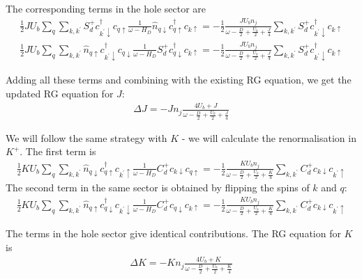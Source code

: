 The corresponding terms in the hole sector are
\begin{equation}\begin{aligned}
	\frac{1}{2} J U_b \sum_{q} \sum_{k,k^\prime} S_d^+ c^\dagger_{k^\prime \downarrow} c_{q \uparrow} \frac{1}{\omega - H_D} \hat n_{q \downarrow} c^\dagger_{q \uparrow}c_{k \uparrow} = -\frac{1}{2}\frac{J U_b n_j}{\omega - \frac{D}{2} + \frac{U_b}{2} + \frac{J}{4}} \sum_{k,k^\prime} S_d^+ c^\dagger_{k^\prime \downarrow} c_{k \uparrow}
\end{aligned}\end{equation}
\begin{equation}\begin{aligned}
	\frac{1}{2} J U_b \sum_{q} \sum_{k,k^\prime} \hat n_{q \uparrow} c^\dagger_{k^\prime \downarrow} c_{q \downarrow} \frac{1}{\omega - H_D}S_d^+ c^\dagger_{q \downarrow} c_{k \uparrow} = -\frac{1}{2}\frac{J U_b n_j}{\omega - \frac{D}{2} + \frac{U_b}{2} + \frac{J}{4}} \sum_{k,k^\prime} S_d^+ c^\dagger_{k^\prime \downarrow} c_{k \uparrow}
\end{aligned}\end{equation}

Adding all these terms and combining with the existing RG equation, we get the updated RG equation for \(J\):
\begin{equation}\begin{aligned}
	\Delta J = -J n_j\frac{4 U_b + J}{\omega - \frac{D}{2} + \frac{U_b}{2} + \frac{J}{4}}
\end{aligned}\end{equation}

We will follow the same strategy with \(K\) - we will calculate the renormalisation in \(K^+\). The first term is
\begin{equation}\begin{aligned}
	\frac{1}{2} K U_b \sum_{q} \sum_{k,k^\prime} \hat n_{q \downarrow} c^\dagger_{q \uparrow}c_{k^\prime \uparrow} \frac{1}{\omega - H_D} C_d^+ c_{k \downarrow} c_{q \uparrow} = -\frac{1}{2}\frac{K U_b n_j}{\omega - \frac{D}{2} + \frac{U_b}{2} + \frac{K}{4}} \sum_{k,k^\prime} C_d^+ c_{k \downarrow} c_{k^\prime \uparrow}
\end{aligned}\end{equation}
The second term in the same sector is obtained by flipping the spins of \(k\) and \(q\):
\begin{equation}\begin{aligned}
	\frac{1}{2} K U_b \sum_{q} \sum_{k,k^\prime} \hat n_{q \uparrow} c^\dagger_{q \downarrow}c_{k^\prime \downarrow} \frac{1}{\omega - H_D} C_d^+ c_{q \downarrow} c_{k \uparrow} = -\frac{1}{2}\frac{K U_b n_j}{\omega - \frac{D}{2} + \frac{U_b}{2} + \frac{K}{4}} \sum_{k,k^\prime} C_d^+ c_{k \downarrow} c_{k^\prime \uparrow}
\end{aligned}\end{equation}

The terms in the hole sector give identical contributions. The RG equation for \(K\) is
\begin{equation}\begin{aligned}
	\Delta K = -K n_j\frac{4 U_b + K}{\omega - \frac{D}{2} + \frac{U_b}{2} + \frac{K}{4}}
\end{aligned}\end{equation}
